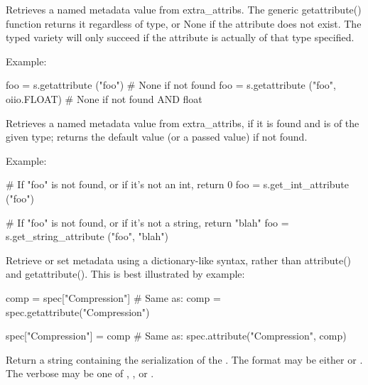 Retrieves a named metadata value from {\cf extra_attribs}.  The generic
{\cf getattribute()} function returns it regardless of type, or {\cf None}
if the attribute does not exist.  The typed variety will only succeed
if the attribute is actually of that type specified.

\noindent Example:
\begin{code}
    foo = s.getattribute ("foo")   # None if not found
    foo = s.getattribute ("foo", oiio.FLOAT)  # None if not found AND float
\end{code}
\apiend

Retrieves a named metadata value from {\cf extra_attribs}, if it is
found and is of the given type; returns the default value (or a passed
value) if not found.

\noindent Example:
\begin{code}
    # If "foo" is not found, or if it's not an int, return 0
    foo = s.get_int_attribute ("foo")

    # If "foo" is not found, or if it's not a string, return "blah"
    foo = s.get_string_attribute ("foo", "blah")
\end{code}
\apiend

\NEW %
Retrieve or set metadata using a dictionary-like syntax, rather than
{\cf attribute()} and {\cf getattribute()}. This is best illustrated by
example:

\begin{code}
    comp = spec["Compression"]
    # Same as:  comp = spec.getattribute("Compression")

    spec["Compression"] = comp
    # Same as: spec.attribute("Compression", comp)
\end{code}
\apiend


Return a string containing the serialization of the \ImageSpec. The {\cf format}
may be either  or . The {\cf verbose} may be one of
, , or .
\apiend

